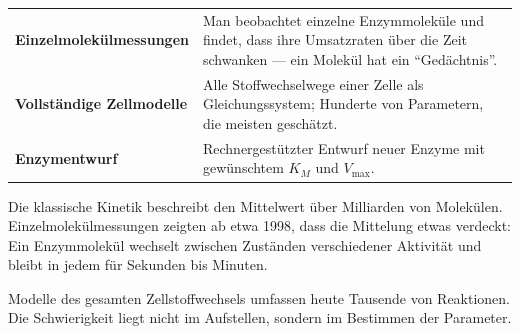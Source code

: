 \begin{forschung}
\begin{center}
{\small
\renewcommand{\arraystretch}{1.45}
\begin{tabular}{@{}P{2.8cm}P{5.4cm}@{}}
\toprule
\textbf{Einzelmolekül\-messungen} & Man beobachtet einzelne Enzymmoleküle und findet, dass ihre Umsatzraten über die Zeit schwanken --- ein Molekül hat ein \enquote{Gedächtnis}.\\
\textbf{Vollständige Zellmodelle} & Alle Stoffwechselwege einer Zelle als Gleichungssystem; Hunderte von Parametern, die meisten geschätzt.\\
\textbf{Enzymentwurf} & Rechnergestützter Entwurf neuer Enzyme mit gewünschtem $K_M$ und $V_{\max}$.\\
\bottomrule
\end{tabular}}
\end{center}

Die klassische Kinetik beschreibt den Mittelwert über Milliarden von Molekülen. Einzelmolekülmessungen zeigten ab etwa 1998, dass die Mittelung etwas verdeckt: Ein Enzymmolekül wechselt zwischen Zuständen verschiedener Aktivität und bleibt in jedem für Sekunden bis Minuten.

\begin{center}
\begin{minipage}{0.88\textwidth}
\end{minipage}
\end{center}

Modelle des gesamten Zellstoffwechsels umfassen heute Tausende von Reaktionen. Die Schwierigkeit liegt nicht im Aufstellen, sondern im Bestimmen der Parameter.

\begin{center}
\begin{minipage}{0.88\textwidth}
\end{minipage}
\end{center}
\end{forschung}


